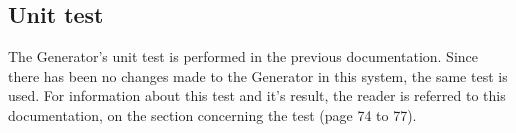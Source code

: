 \subsection{Unit test}
The Generator's unit test is performed in the previous documentation. Since there has been no changes made to the Generator in this system, the same test is used. For information about this test and it's result, the reader is referred to this documentation\cite{BAC_rullefelt}, on the section concerning the test (page 74 to 77).